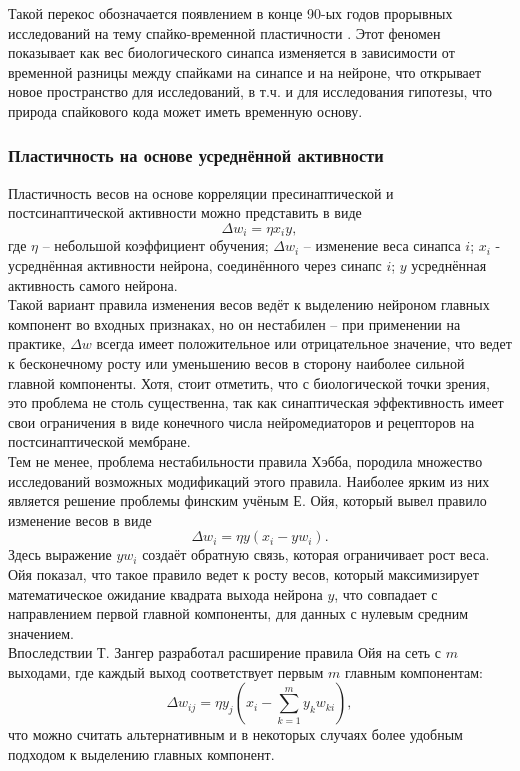 \documentclass[a4paper,10pt]{article}
\begin{document}
\indent Такой перекос обозначается появлением в конце 90-ых годов прорывных исследований на тему спайко-временной пластичности \cite{stdp1,stdp2,stdp3,stdp4}. Этот феномен показывает как вес биологического синапса изменяется в зависимости от временной разницы между спайками на синапсе и на нейроне, что открывает новое пространство для исследований, в т.ч. и для исследования гипотезы, что природа спайкового кода может иметь временную основу.\\

\subsubsection{Пластичность на основе усреднённой активности}\label{sec:hebb}
\indent Пластичность весов на основе корреляции пресинаптической и постсинаптической активности можно представить в виде
\begin{equation}
\Delta w_{i} = \eta x_{i}y,
\end{equation}
где $\eta$ -- небольшой коэффициент обучения; $\Delta w_{i}$ -- изменение веса синапса $i$; $x_{i}$ - усреднённая активности нейрона, соединённого через синапс $i$; $y$ усреднённая активность самого нейрона.\\
\indent Такой вариант правила изменения весов ведёт к выделению нейроном главных компонент \cite{anderson1963} во входных признаках, но он нестабилен -- при применении на практике, $\Delta w$ всегда имеет положительное или отрицательное значение, что ведет к бесконечному росту или уменьшению весов в сторону наиболее сильной главной компоненты. Хотя, стоит отметить, что с биологической точки зрения, это проблема не столь существенна, так как синаптическая эффективность имеет свои ограничения в виде конечного числа нейромедиаторов и рецепторов на постсинаптической мембране\cite{NeuralAndAdaptiveSystems}.\\
\indent Тем не менее, проблема нестабильности правила Хэбба, породила множество исследований возможных модификаций этого правила. Наиболее ярким из них является решение проблемы финским учёным Е. Ойя, который вывел правило изменение весов в виде
\begin{equation}
\Delta w_{i} = \eta y (x_{i} - yw_{i}).
\end{equation}
Здесь выражение $yw_{i}$ создаёт обратную связь, которая ограничивает рост веса. Ойя показал, что такое правило ведет к росту весов, который максимизирует математическое ожидание квадрата выхода нейрона $y$, что совпадает с направлением первой главной компоненты, для данных с нулевым средним значением.\\
\indent Впоследствии Т. Зангер разработал расширение правила Ойя на сеть с $m$ выходами, где каждый выход соответствует первым $m$ главным компонентам:
\begin{equation}
\Delta w_{ij} = \eta y_{j} (x_{i} - \sum_{k=1}^{m}y_{k}w_{ki}),
\end{equation}
что можно считать альтернативным и в некоторых случаях более удобным подходом к выделению главных компонент.
\end{document}
